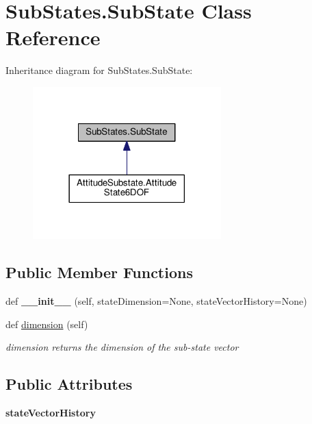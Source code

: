 \hypertarget{classSubStates_1_1SubState}{}\section{Sub\+States.\+Sub\+State Class Reference}
\label{classSubStates_1_1SubState}


Inheritance diagram for Sub\+States.\+Sub\+State\+:\nopagebreak
\begin{figure}[H]
\begin{center}
\leavevmode
\includegraphics[width=206pt]{classSubStates_1_1SubState__inherit__graph}
\end{center}
\end{figure}
\subsection*{Public Member Functions}
\begin{DoxyCompactItemize}
\item 
def {\bfseries \+\_\+\+\_\+init\+\_\+\+\_\+} (self, state\+Dimension=None, state\+Vector\+History=None)\hypertarget{classSubStates_1_1SubState_a5ff829fb892680db4e3643e6b1f6cc9b}{}\label{classSubStates_1_1SubState_a5ff829fb892680db4e3643e6b1f6cc9b}

\item 
def \hyperlink{classSubStates_1_1SubState_a4aebea19a134cb871a7c0b6c2709546a}{dimension} (self)
\begin{DoxyCompactList}\small\item\em dimension returns the dimension of the sub-\/state vector \end{DoxyCompactList}\end{DoxyCompactItemize}
\subsection*{Public Attributes}
\begin{DoxyCompactItemize}
\item 
{\bfseries state\+Vector\+History}\hypertarget{classSubStates_1_1SubState_a24bf2de56fc3037d91cba43d28f3bf60}{}\label{classSubStates_1_1SubState_a24bf2de56fc3037d91cba43d28f3bf60}

\end{DoxyCompactItemize}


